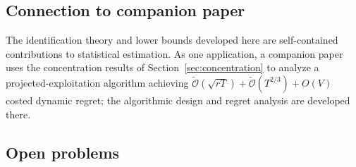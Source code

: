 \documentclass[12pt]{article}
\newcommand{\tilO}{\widetilde{\mathcal{O}}}
\theoremstyle{plain}
\theoremstyle{definition}
\begin{document}
\subsection{Connection to companion paper}

The identification theory and lower bounds developed here are self-contained contributions to statistical estimation. As one application, a companion paper uses the concentration results of Section~\ref{sec:concentration} to analyze a projected-exploitation algorithm achieving $\tilO(\sqrt{rT}) + \tilO(T^{2/3}) + O(V)$ costed dynamic regret; the algorithmic design and regret analysis are developed there.

\subsection{Open problems}
\end{document}
